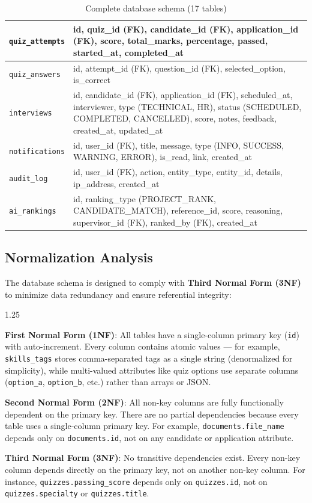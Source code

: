 \begin{table}[H]
\begin{tabular}{|p{3cm}|p{10cm}|}
\hline
\texttt{quiz\_attempts} & id, quiz\_id (FK), candidate\_id (FK), application\_id (FK), score, total\_marks, percentage, passed, started\_at, completed\_at \\
\hline
\texttt{quiz\_answers} & id, attempt\_id (FK), question\_id (FK), selected\_option, is\_correct \\
\hline
\texttt{interviews} & id, candidate\_id (FK), application\_id (FK), scheduled\_at, interviewer, type (TECHNICAL, HR), status (SCHEDULED, COMPLETED, CANCELLED), score, notes, feedback, created\_at, updated\_at \\
\hline
\texttt{notifications} & id, user\_id (FK), title, message, type (INFO, SUCCESS, WARNING, ERROR), is\_read, link, created\_at \\
\hline
\texttt{audit\_log} & id, user\_id (FK), action, entity\_type, entity\_id, details, ip\_address, created\_at \\
\hline
\texttt{ai\_rankings} & id, ranking\_type (PROJECT\_RANK, CANDIDATE\_MATCH), reference\_id, score, reasoning, supervisor\_id (FK), ranked\_by (FK), created\_at \\
\hline
\end{tabular}
\caption{Complete database schema (17 tables)}
\end{table}

\subsection{Normalization Analysis}
The database schema is designed to comply with \textbf{Third Normal Form (3NF)} to minimize data redundancy and ensure referential integrity:

\begin{itemize}[leftmargin=2cm, topsep=4pt]
    \begin{spacing}{1.25}
        \item \textbf{First Normal Form (1NF)}: All tables have a single-column primary key (\texttt{id}) with auto-increment. Every column contains atomic values — for example, \texttt{skills\_tags} stores comma-separated tags as a single string (denormalized for simplicity), while multi-valued attributes like quiz options use separate columns (\texttt{option\_a}, \texttt{option\_b}, etc.) rather than arrays or JSON.
        \item \textbf{Second Normal Form (2NF)}: All non-key columns are fully functionally dependent on the primary key. There are no partial dependencies because every table uses a single-column primary key. For example, \texttt{documents.file\_name} depends only on \texttt{documents.id}, not on any candidate or application attribute.
        \item \textbf{Third Normal Form (3NF)}: No transitive dependencies exist. Every non-key column depends directly on the primary key, not on another non-key column. For instance, \texttt{quizzes.passing\_score} depends only on \texttt{quizzes.id}, not on \texttt{quizzes.specialty} or \texttt{quizzes.title}.
    \end{spacing}
\end{itemize}

